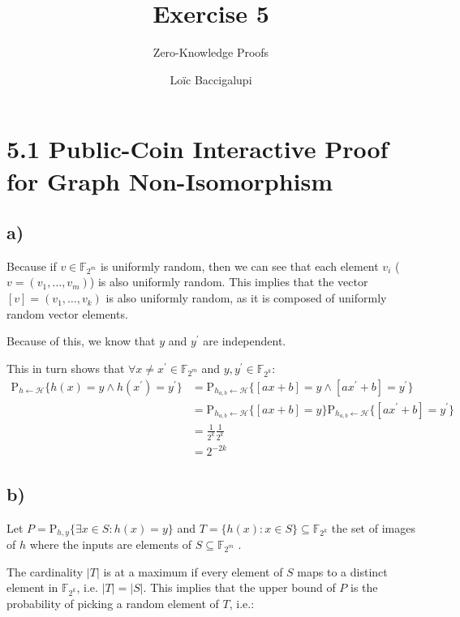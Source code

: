 \documentclass{scrartcl}
\title{Exercise 5}
\subtitle{Zero-Knowledge Proofs}
\author{Loïc Baccigalupi}
\begin{document}
\maketitle

\section*{5.1 Public-Coin Interactive Proof for Graph Non-Isomorphism}

\subsection*{a)}

Because if $v \in \mathbb{F}_{2^m}$ is uniformly random, then we can see that each element $v_i$ ($v = (v_1, \dots, v_m)$) is also uniformly random. 
This implies that the vector $[v] = (v_1, \dots, v_k)$ is also uniformly random, as it is composed of uniformly random vector elements.

Because of this, we know that $y$ and $y^{\prime}$ are independent.

This in turn shows that $\forall x \neq x^{\prime} \in \mathbb{F}_{2^m}$ and $y,y^{\prime} \in \mathbb{F}_{2^k}$:
\begin{equation*}
    \begin{split}
        \text{P}_{h \leftarrow \mathcal{H}}\{h(x)=y \wedge h(x^{\prime}) = y^{\prime} \}
            &= \text{P}_{h_{a,b} \leftarrow \mathcal{H}}\{[ax+b]=y \wedge [ax^{\prime} + b] = y^{\prime} \} \\
            &= \text{P}_{h_{a,b} \leftarrow \mathcal{H}}\{[ax+b]=y \}\text{P}_{h_{a,b} \leftarrow \mathcal{H}}\{[ax^{\prime} + b] = y^{\prime} \} \\
            &= \frac{1}{2^k}\frac{1}{2^k} \\
            &= 2^{-2k}
    \end{split}
\end{equation*}


\subsection*{b)}

Let $P = \text{P}_{h, y}\{\exists x \in S : h(x) = y \} $ and $T = \{h(x) : x \in S \} \subseteq \mathbb{F}_{2^k}$ the set of images of $h$ where the inputs are elements of $S \subseteq \mathbb{F}_{2^m}$ .

The cardinality $|T|$ is at a maximum if every element of $S$ maps to a distinct element in $\mathbb{F}_{2^k}$, i.e. $|T|=|S|$.
This implies that the upper bound of $P$ is the probability of picking a random element of $T$, i.e.:
\end{document}
